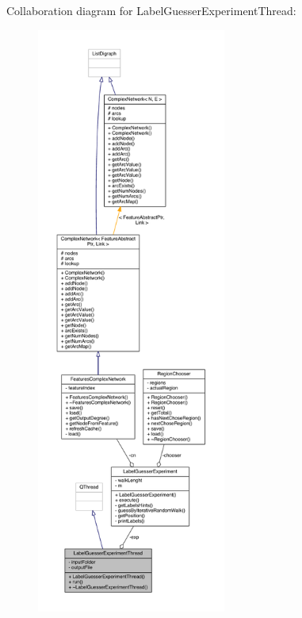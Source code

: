 Collaboration diagram for Label\+Guesser\+Experiment\+Thread\+:
\nopagebreak
\begin{figure}[H]
\begin{center}
\leavevmode
\includegraphics[height=550pt]{class_label_guesser_experiment_thread__coll__graph}
\end{center}
\end{figure}


